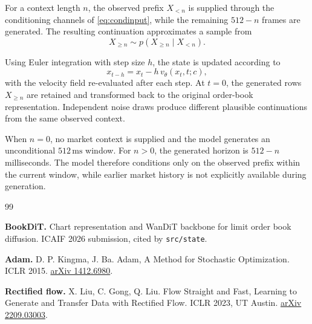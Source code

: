 \documentclass[10pt,a4paper]{article}
\begin{document}
For a context length $n$, the observed prefix $X_{<n}$ is supplied through the
conditioning channels of \eqref{eq:condinput}, while the remaining $512-n$
frames are generated. The resulting continuation approximates a sample from
\[
X_{\geq n}
\sim
p\!\left(X_{\geq n}\mid X_{<n}\right).
\]

Using Euler integration with step size $h$, the state is updated according to
\[
x_{t-h}
=
x_t-h\,v_\theta(x_t,t;c),
\]
with the velocity field re-evaluated after each step. At $t=0$, the generated
rows $X_{\geq n}$ are retained and transformed back to the original order-book
representation. Independent noise draws produce different plausible
continuations from the same observed context.

When $n=0$, no market context is supplied and the model generates an
unconditional $512\,\mathrm{ms}$ window. For $n>0$, the generated horizon is
$512-n$ milliseconds. The model therefore conditions only on the observed prefix
within the current window, while earlier market history is not explicitly
available during generation.


\begin{thebibliography}{99}\small

 \textbf{BookDiT.}
\newblock Chart representation and WanDiT backbone for limit order book
diffusion.
\newblock ICAIF 2026 submission, cited by \texttt{src/state}.

 \textbf{Adam.} D. P. Kingma, J. Ba.
\newblock Adam, A Method for Stochastic Optimization.
\newblock ICLR 2015.
\href{https://arxiv.org/abs/1412.6980}{arXiv 1412.6980}.

 \textbf{Rectified flow.} X. Liu, C. Gong, Q. Liu.
\newblock Flow Straight and Fast, Learning to Generate and Transfer Data with
Rectified Flow.
\newblock ICLR 2023, UT Austin.
\href{https://arxiv.org/abs/2209.03003}{arXiv 2209.03003}.

\end{thebibliography}
\end{document}
